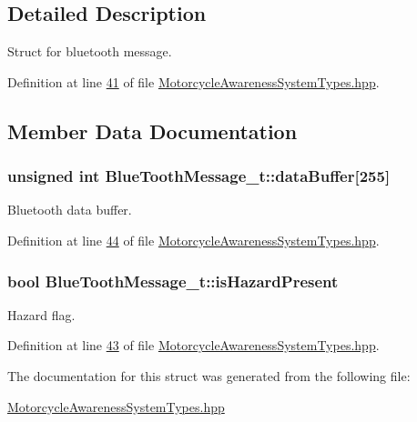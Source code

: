 \subsection{Detailed Description}
Struct for bluetooth message. 

Definition at line \hyperlink{MotorcycleAwarenessSystemTypes_8hpp_source_l00041}{41} of file \hyperlink{MotorcycleAwarenessSystemTypes_8hpp_source}{Motorcycle\-Awareness\-System\-Types.\-hpp}.



\subsection{Member Data Documentation}
\hypertarget{structBlueToothMessage__t_ab872789a32f068dae8bcf77122256b78}{
\subsubsection[{data\-Buffer}]{\setlength{\rightskip}{0pt plus 5cm}unsigned int Blue\-Tooth\-Message\-\_\-t\-::data\-Buffer\mbox{[}255\mbox{]}}}\label{structBlueToothMessage__t_ab872789a32f068dae8bcf77122256b78}


Bluetooth data buffer. 



Definition at line \hyperlink{MotorcycleAwarenessSystemTypes_8hpp_source_l00044}{44} of file \hyperlink{MotorcycleAwarenessSystemTypes_8hpp_source}{Motorcycle\-Awareness\-System\-Types.\-hpp}.

\hypertarget{structBlueToothMessage__t_a2dd315aa1cba1d2d3045e26b9f171e61}{
\subsubsection[{is\-Hazard\-Present}]{\setlength{\rightskip}{0pt plus 5cm}bool Blue\-Tooth\-Message\-\_\-t\-::is\-Hazard\-Present}}\label{structBlueToothMessage__t_a2dd315aa1cba1d2d3045e26b9f171e61}


Hazard flag. 



Definition at line \hyperlink{MotorcycleAwarenessSystemTypes_8hpp_source_l00043}{43} of file \hyperlink{MotorcycleAwarenessSystemTypes_8hpp_source}{Motorcycle\-Awareness\-System\-Types.\-hpp}.



The documentation for this struct was generated from the following file\-:\begin{DoxyCompactItemize}
\item 
\hyperlink{MotorcycleAwarenessSystemTypes_8hpp}{Motorcycle\-Awareness\-System\-Types.\-hpp}\end{DoxyCompactItemize}
